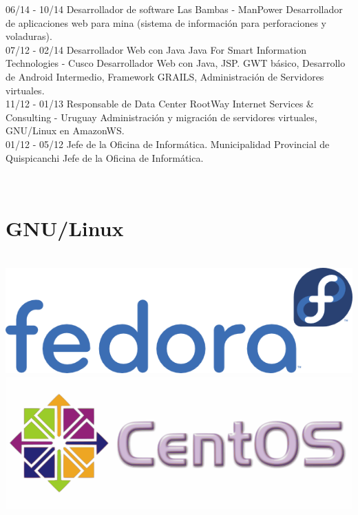 \documentclass[]{friggeri-cv}
\begin{document}
\begin{entrylist}
    \entry
    {06/14 - 10/14}
    {Desarrollador de software}
    {Las Bambas - ManPower}
    {Desarrollador de aplicaciones web para mina (sistema de informaci\'on para perforaciones y voladuras).\\}
    \entry
    {07/12 - 02/14}
    {Desarrollador Web con Java}
    {Java For Smart Information Technologies - Cusco}
    {Desarrollador Web con Java, JSP. GWT b\'asico, Desarrollo de Android Intermedio, Framework GRAILS, Administraci\'on de Servidores virtuales.\\}
    \entry
    {11/12 - 01/13}
    {Responsable de Data Center}
    {{RootWay Internet Services \& Consulting - Uruguay}}
    {{Administraci\'on y migraci\'on de servidores virtuales, GNU/Linux en AmazonWS. \\ }}
    \entry
    {01/12 - 05/12}
    {Jefe de la Oficina de Inform\'atica.}
    {Municipalidad Provincial de Quispicanchi}
    {Jefe de la Oficina de Inform\'atica.\\}
\end{entrylist}
\begin{aside}
    ~
    \section{GNU/Linux}
    ~
    \includegraphics[scale=0.12]{img/fedora}
    \includegraphics[scale=0.12]{img/centos}
    ~
\end{aside}
\end{document}
